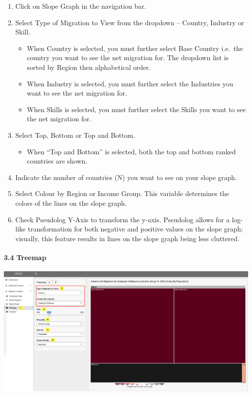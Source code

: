 \documentclass[
]{article}
\providecommand{\tightlist}{%
  \setlength{\itemsep}{0pt}\setlength{\parskip}{0pt}}
\begin{document}
\begin{enumerate}
\def\labelenumi{\arabic{enumi}.}
\item
  Click on Slope Graph in the navigation bar.
\item
  Select Type of Migration to View from the dropdown -- Country,
  Industry or Skill.

  \begin{itemize}
  \item
    When Country is selected, you must further select Base Country
    i.e.~the country you want to see the net migration for. The dropdown
    list is sorted by Region then alphabetical order.
  \item
    When Industry is selected, you must further select the Industries
    you want to see the net migration for.
  \item
    When Skills is selected, you must further select the Skills you want
    to see the net migration for.
  \end{itemize}
\item
  Select Top, Bottom or Top and Bottom.

  \begin{itemize}
  \tightlist
  \item
    When ``Top and Bottom'' is selected, both the top and bottom ranked
    countries are shown.
  \end{itemize}
\item
  Indicate the number of countries (N) you want to see on your slope
  graph.
\item
  Select Colour by Region or Income Group. This variable determines the
  colors of the lines on the slope graph.
\item
  Check Pseudolog Y-Axis to transform the y-axis. Pseudolog allows for a
  log-like transformation for both negative and positive values on the
  slope graph; visually, this feature results in lines on the slope
  graph being less cluttered.
\end{enumerate}

\hypertarget{treemap}{%
\paragraph{3.4 Treemap}\label{treemap}}

\includegraphics{Images/14-tree.png}
\end{document}
